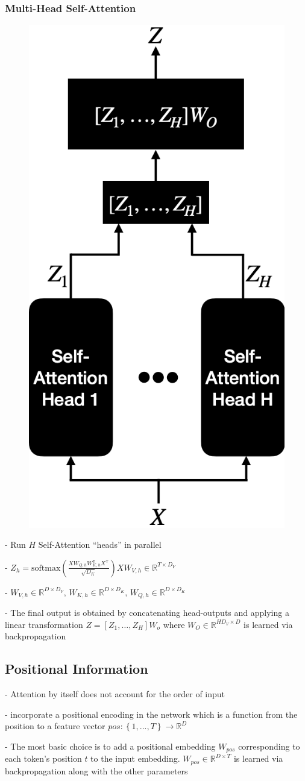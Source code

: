 \subsubsection*{Multi-Head Self-Attention}

\begin{figure} 
  \centering
  \includegraphics[width=0.3\columnwidth]{figures/multi_head.png}
\end{figure}

- Run $H$ Self-Attention “heads” in parallel

- $Z_{h}={\mathrm{softmax}}\left({\frac{X W_{Q,h}W_{K,h}^{\mathsf{T}}X^{\mathsf{T}}}{\sqrt{D_{K}}}}\right)X W_{V,h}\in\mathbb{R}^{T\times D_{V}}$ 


- $W_{V,h}\in\mathbb{R}^{D\times D_{V}},\,W_{K,h}\in\mathbb{R}^{D\times D_{K}},\,W_{Q,h}\in\mathbb{R}^{D\times D_{K}}$

- The final output is obtained by concatenating head-outputs and applying a linear transformation $Z=[Z_{1},\dots,Z_{H}]W_{o}$ where $W_{O}\in\mathbb{R}^{H D_{V}\times D}$ is learned via backpropagation

\subsection*{Positional Information}

- Attention by itself does not account for the order of input

- incorporate a positional encoding in the network which is a function from the position to a feature vector $p o s:\left\{1,...,T\right\}\rightarrow\mathbb{R}^{D}$

- The most basic choice is to add a positional embedding $W_{p o s}$ corresponding to each token's position $t$ to the input embedding. $W_{p o s}\in\mathbb{R}^{D\times T}$ is learned via backpropagation along with the other parameters

